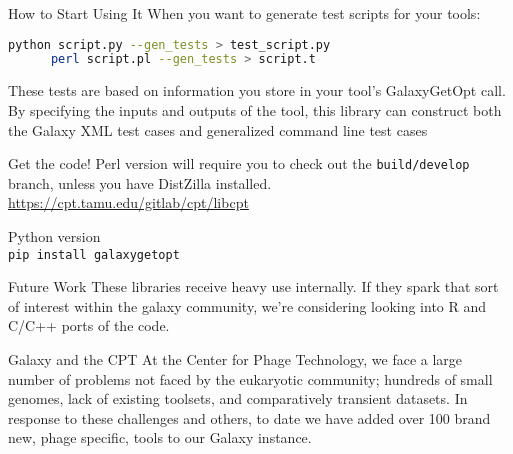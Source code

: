 \documentclass[final,t,20pt]{beamer}
\begin{document}
\begin{frame}[fragile]
\begin{columns}[t]
\begin{column}{.3\linewidth}
\begin{block}{How to Start Using It}
                When you want to generate test scripts for your tools:
                \begin{lstlisting}[language=bash,basicstyle=\small]
    python script.py --gen_tests > test_script.py
      perl script.pl --gen_tests > script.t
                \end{lstlisting}
                These tests are based on information you store in your tool's
                GalaxyGetOpt call. By specifying the inputs and outputs of the
                tool, this library can construct both the Galaxy XML test cases
                and generalized command line test cases
            \end{block}
            \begin{block}{Get the code!}
                \justifying
                Perl version will require you to check out the
                \texttt{build/develop} branch, unless you have DistZilla
                installed.\\
                \url{https://cpt.tamu.edu/gitlab/cpt/libcpt}


                Python version\\
                \texttt{pip install galaxygetopt}
            \end{block}
            \begin{block}{Future Work}
                \justifying
                These libraries receive heavy use internally. If they spark
                that sort of interest within the galaxy community, we're
                considering looking into R and C/C++ ports of the code.
            \end{block}
            \begin{block}{Galaxy and the CPT}
                \justifying
                At the Center for Phage Technology, we face a large number of
                problems not faced by the eukaryotic community; hundreds of
                small genomes, lack of existing toolsets, and comparatively
                transient datasets. In response to these challenges and others,
                to date we have added over 100 brand new, phage specific, tools
                to our Galaxy instance.\\\ \\


\end{block}
\end{column}
\end{columns}
\end{frame}
\end{document}
